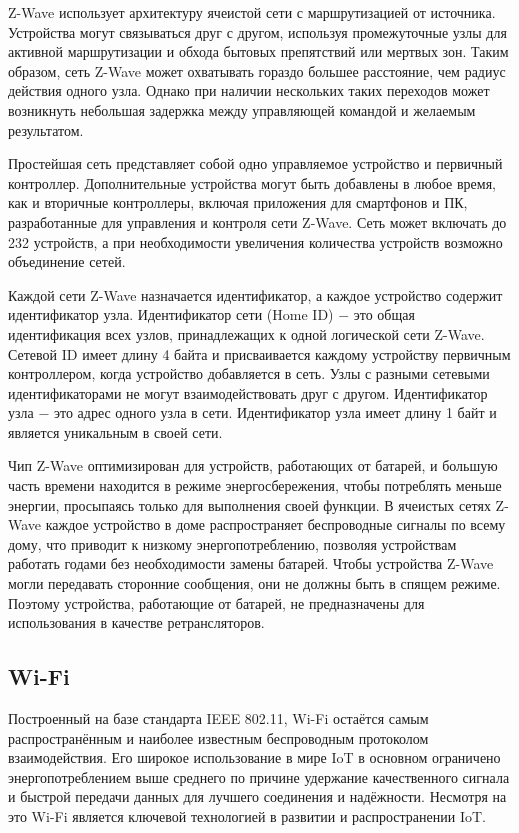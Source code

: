 	Z-Wave использует архитектуру ячеистой сети с маршрутизацией от источника. Устройства могут 
	связываться друг с другом, используя промежуточные узлы для активной маршрутизации и обхода 
	бытовых препятствий или мертвых зон. Таким образом, сеть Z-Wave может охватывать гораздо большее 
	расстояние, чем радиус действия одного узла. Однако при наличии нескольких таких переходов может 
	возникнуть небольшая задержка между управляющей командой и желаемым результатом.
	
	Простейшая сеть представляет собой одно управляемое устройство и первичный контроллер. Дополнительные 
	устройства могут быть добавлены в любое время, как и вторичные контроллеры, включая приложения 
	для смартфонов и ПК, разработанные для управления и контроля сети Z-Wave. Сеть может включать 
	до 232 устройств, а при необходимости увеличения количества устройств возможно объединение сетей.
	
	Каждой сети Z-Wave назначается идентификатор, а каждое устройство содержит идентификатор узла. 
	Идентификатор сети (Home ID) $-$ это общая идентификация всех узлов, принадлежащих к одной логической 
	сети Z-Wave. Сетевой ID имеет длину 4 байта и присваивается каждому устройству первичным контроллером, 
	когда устройство добавляется в сеть. Узлы с разными сетевыми идентификаторами не могут взаимодействовать 
	друг с другом. Идентификатор узла $-$ это адрес одного узла в сети. Идентификатор узла имеет 
	длину 1 байт и является уникальным в своей сети.
	
	Чип Z-Wave оптимизирован для устройств, работающих от батарей, и большую часть времени находится 
	в режиме энергосбережения, чтобы потреблять меньше энергии, просыпаясь только для выполнения своей 
	функции. В ячеистых сетях Z-Wave каждое устройство в доме распространяет беспроводные сигналы по 
	всему дому, что приводит к низкому энергопотреблению, позволяя устройствам работать годами без 
	необходимости замены батарей. Чтобы устройства Z-Wave могли передавать сторонние сообщения, 
	они не должны быть в спящем режиме. Поэтому устройства, работающие от батарей, не предназначены для 
	использования в качестве ретрансляторов.
	
	
	\subsection{Wi-Fi}
	Построенный на базе стандарта IEEE 802.11, Wi-Fi остаётся самым распространённым и наиболее
	известным беспроводным протоколом взаимодействия. Его широкое использование в мире IoT в
	основном ограничено энергопотреблением выше среднего по причине удержание качественного сигнала
	и быстрой передачи данных для лучшего соединения и надёжности. Несмотря на это Wi-Fi является
	ключевой технологией в развитии и распространении IoT.
	
